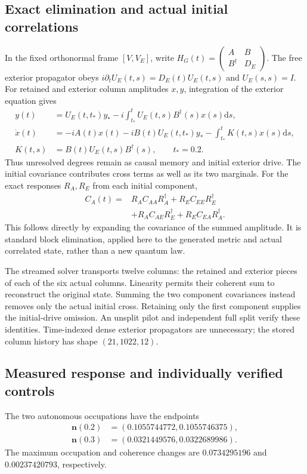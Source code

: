 \documentclass[11pt]{article}
\newcommand{\dd}{\mathrm{d}}
\begin{document}
\subsection{Exact elimination and actual initial correlations}
In the fixed orthonormal frame $[V,V_E]$, write
$H_G(t)=\left(\begin{smallmatrix}A&B\\B^\dagger&D_E\end{smallmatrix}\right)$.
The free exterior propagator obeys
$i\partial_tU_E(t,s)=D_E(t)U_E(t,s)$ and $U_E(s,s)=I$.
For retained and exterior column amplitudes $x,y$, integration of the
exterior equation gives
\begin{align}\label{eq:elimination}
y(t)&=U_E(t,t_*)y_* -i\int_{t_*}^tU_E(t,s)B^\dagger(s)x(s)\dd s,\\
\dot x(t)&=-iA(t)x(t)-iB(t)U_E(t,t_*)y_*
 -\int_{t_*}^tK(t,s)x(s)\dd s,\nonumber\\
K(t,s)&=B(t)U_E(t,s)B^\dagger(s),\qquad t_*=0.2.\nonumber
\end{align}
Thus unresolved degrees remain as causal memory and initial exterior
drive. The initial covariance contributes cross terms as well as its two
marginals. For the exact responses $R_A,R_E$ from each initial component,
\begin{align}\label{eq:localcov}
C_A(t)={}&R_AC_{AA}R_A^\dagger+R_EC_{EE}R_E^\dagger\nonumber\\
 &+R_AC_{AE}R_E^\dagger+R_EC_{EA}R_A^\dagger.
\end{align}
This follows directly by expanding the covariance of the summed amplitude.
It is standard block elimination, applied here to the generated metric and
actual correlated state, rather than a new quantum law.

The streamed solver transports twelve columns: the retained and exterior
pieces of each of the six actual columns. Linearity permits their coherent
sum to reconstruct the original state. Summing the two component
covariances instead removes only the actual initial cross.
Retaining only the first component supplies the initial-drive omission.
An unsplit pilot and independent full split verify these identities.
Time-indexed dense exterior propagators are unnecessary; the stored
column history has shape $(21,1022,12)$.

\subsection{Measured response and individually verified controls}
The two autonomous occupations have the endpoints
\begin{align*}
\boldsymbol n(0.2)&=(0.1055744772,0.1055746375),\\
\boldsymbol n(0.3)&=(0.0321449576,0.0322689986).
\end{align*}
The maximum occupation and coherence changes are $0.0734295196$ and
$0.00237420793$, respectively.
\end{document}
